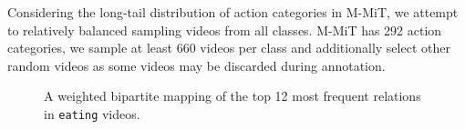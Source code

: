 \documentclass[letterpaper]{article}
\begin{document}
Considering the long-tail distribution of action categories in M-MiT, we attempt to relatively balanced sampling videos from all classes. M-MiT has 292 action categories, we sample at least 660 videos per class and additionally select other random videos as some videos may be discarded during annotation.
\begin{figure}[t]
  \centering
  \caption{A weighted bipartite mapping of the top 12 most frequent relations in \texttt{eating} videos.}
   \label{fig:sanki}
\end{figure}
\end{document}
